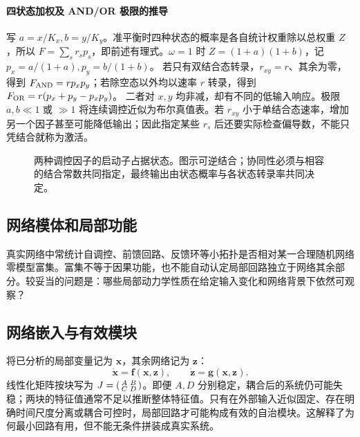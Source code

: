 \documentclass[11pt,a4paper,UTF8,fontset=fandol]{ctexart}
\begin{document}
\paragraph{四状态加权及 AND/OR 极限的推导}
写 $a=x/K_x,b=y/K_y$。准平衡时四种状态的概率是各自统计权重除以总权重 $Z$，所以 $F=\sum_s r_s p_s$，即前述有理式。$\omega=1$ 时 $Z=(1+a)(1+b)$，记 $p_x=a/(1+a),p_y=b/(1+b)$。
若只有双结合态转录，$r_{xy}=r$、其余为零，得到
$F_{\rm AND}=rp_xp_y$；若除空态以外均以速率 $r$ 转录，得到
$F_{\rm OR}=r(p_x+p_y-p_xp_y)$。
二者对 $x,y$ 均非减，却有不同的低输入响应。极限 $a,b\ll1$ 或 $\gg1$ 将连续调控近似为布尔真值表。若 $r_{xy}$ 小于单结合态速率，增加另一个因子甚至可能降低输出；因此指定某些 $r_s$ 后还要实际检查偏导数，不能只凭结合就称为激活。
\begin{figure}[htbp]\centering
{}
\caption{两种调控因子的启动子占据状态。图示可逆结合；协同性必须与相容的结合常数共同指定，最终输出由状态概率与各状态转录率共同决定。}
\end{figure}


\subsection{网络模体和局部功能}
真实网络中常统计自调控、前馈回路、反馈环等小拓扑是否相对某一合理随机网络零模型富集。富集不等于因果功能，也不能自动认定局部回路独立于网络其余部分。较妥当的问题是：哪些局部动力学性质在给定输入变化和网络背景下依然可观察？

\subsection{网络嵌入与有效模块}
将已分析的局部变量记为 $\bm x$，其余网络记为 $\bm z$：
\begin{equation}\dot{\bm x}=\bm f(\bm x,\bm z),\qquad\dot{\bm z}=\bm g(\bm x,\bm z).\end{equation}
线性化矩阵按块写为 $J=\begin{psmallmatrix}A&B\\C&D\end{psmallmatrix}$。即便 $A,D$ 分别稳定，耦合后的系统仍可能失稳；两块的特征值通常不足以推断整体特征值。只有在外部输入近似固定、存在明确时间尺度分离或耦合可控时，局部回路才可能构成有效的自治模块。这解释了为何最小回路有用，但不能无条件拼装成真实系统。
\end{document}
